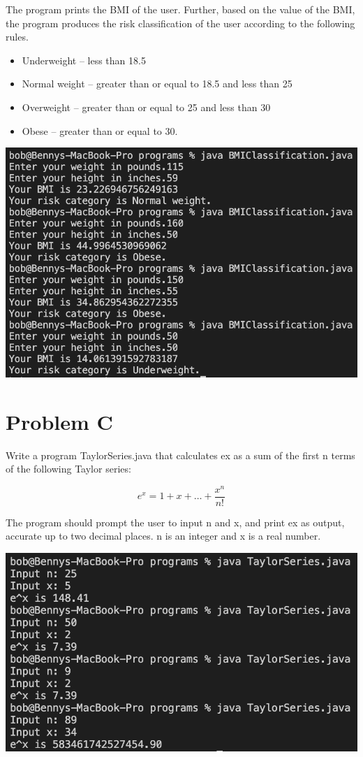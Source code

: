 \documentclass{article}
\begin{document}
\noindent
The program prints the BMI of the user. Further, based on the value of the BMI, the program produces the risk classification of the user according to the following rules.
\begin{itemize}
    \item Underweight – less than 18.5
    \item Normal weight – greater than or equal to 18.5 and less than 25
    \item Overweight – greater than or equal to 25 and less than 30
    \item Obese – greater than or equal to 30.
\end{itemize}

\begin{center}
\includegraphics[width=\textwidth]{./images/BMIclass.png}
\end{center}

\section*{Problem C}
Write a program TaylorSeries.java that calculates ex as a sum of the first n terms of the following Taylor series:

\[e^x = 1 + x +\ldots+\frac{x^n}{n!}\]

\noindent
The program should prompt the user to input n and x, and print ex as output, accurate up to two decimal places. n is an integer and x is a real number.

\begin{center}
\includegraphics[width=\textwidth]{./images/taylor.png}
\end{center}
\end{document}
